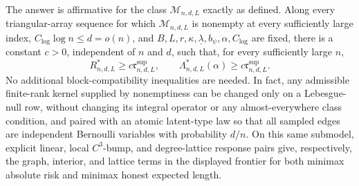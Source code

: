 The answer is affirmative for the class \(\mathcal M_{n,d,L}\) exactly as defined.  Along every triangular-array sequence for which \(\mathcal M_{n,d,L}\) is nonempty at every sufficiently large index, \(C_{\log}\log n\leq d=o(n)\), and \(B,L,r,\kappa,\underline\lambda,b_\psi,\alpha,C_{\log}\) are fixed, there is a constant \(c>0\), independent of \(n\) and \(d\), such that, for every sufficiently large \(n\),
\[
 R^*_{n,d,L}\geq c\mathfrak r^{\mathrm{sup}}_{n,d,L},
 \qquad
 \Lambda^*_{n,d,L}(\alpha)\geq c\mathfrak r^{\mathrm{sup}}_{n,d,L}.
\]
No additional block-compatibility inequalities are needed.  In fact, any admissible finite-rank kernel supplied by nonemptiness can be changed only on a Lebesgue-null row, without changing its integral operator or any almost-everywhere class condition, and paired with an atomic latent-type law so that all sampled edges are independent Bernoulli variables with probability \(d/n\).  On this same submodel, explicit linear, local \(C^3\)-bump, and degree-lattice response pairs give, respectively, the graph, interior, and lattice terms in the displayed frontier for both minimax absolute risk and minimax honest expected length.